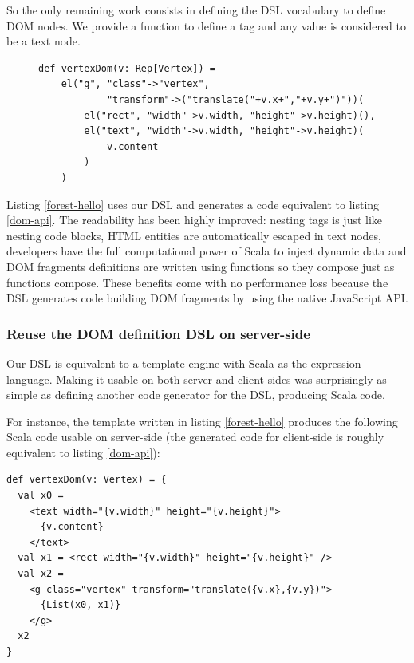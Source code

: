 \documentclass[preprint]{sigplanconf}
\begin{document}
So the only remaining work consists in defining the DSL vocabulary to define DOM nodes. We provide a 
function to define a tag and any  value is considered to be a text node.

\begin{figure}
\begin{lstlisting}[label=forest-hello,caption=DOM definition DSL]
def vertexDom(v: Rep[Vertex]) =
    el("g", "class"->"vertex",
            "transform"->("translate("+v.x+","+v.y+")"))(
        el("rect", "width"->v.width, "height"->v.height)(),
        el("text", "width"->v.width, "height"->v.height)(
            v.content
        )
    )
\end{lstlisting}
\end{figure}

Listing \ref{forest-hello} uses our DSL and generates a code equivalent to listing \ref{dom-api}. The readability has
been highly improved: nesting tags is just like nesting code blocks, HTML entities are
automatically escaped in text nodes, developers have the full computational power of Scala to inject dynamic data and
DOM fragments definitions are written using functions so they compose just as functions compose. These benefits come
with no performance loss because the DSL generates code building DOM fragments by using the native JavaScript API.

\subsubsection{Reuse the DOM definition DSL on server-side}

Our DSL is equivalent to a template engine with Scala as the expression language. Making it usable on both server and
client sides was surprisingly as simple as defining another code generator for the DSL, producing Scala code.

For instance, the template written in listing \ref{forest-hello} produces the following Scala code usable on
server-side (the generated code for client-side is roughly equivalent to listing \ref{dom-api}):

\begin{lstlisting}
def vertexDom(v: Vertex) = {
  val x0 =
    <text width="{v.width}" height="{v.height}">
      {v.content}
    </text>
  val x1 = <rect width="{v.width}" height="{v.height}" />
  val x2 =
    <g class="vertex" transform="translate({v.x},{v.y})">
      {List(x0, x1)}
    </g>
  x2
}
\end{lstlisting}
\end{document}
